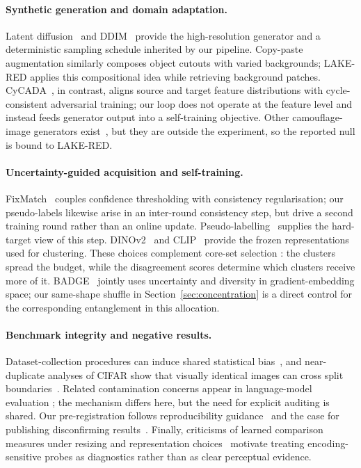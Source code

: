\documentclass{article}
\begin{document}




\paragraph{Synthetic generation and domain adaptation.}
Latent diffusion~\citep{rombach2022high} and DDIM~\citep{song2021denoising} provide the high-resolution
generator and a deterministic sampling schedule inherited by our pipeline. Copy-paste augmentation
\citep{ghiasi2021simple} similarly composes object cutouts with varied backgrounds; LAKE-RED applies
this compositional idea while retrieving background patches. CyCADA~\citep{hoffman2018cycada}, in
contrast, aligns source and target feature distributions with cycle-consistent adversarial training; our loop does not operate at the feature level and instead feeds generator output into a
self-training objective. Other camouflage-image generators exist~\citep{chen2025realcamo}, but they
are outside the experiment, so the reported null is bound to LAKE-RED.

\paragraph{Uncertainty-guided acquisition and self-training.}
FixMatch~\citep{sohn2020fixmatch} couples confidence thresholding with consistency regularisation; our pseudo-labels likewise arise in an inter-round consistency step, but drive a second training
round rather than an online update. Pseudo-labelling~\citep{lee2013pseudo} supplies the hard-target
view of this step. DINOv2~\citep{oquab2024dinov2} and CLIP~\citep{radford2021learning} provide the
frozen representations used for clustering. These choices complement core-set selection
\citep{sener2018active}: the clusters spread the budget, while the disagreement scores determine
which clusters receive more of it. BADGE~\citep{ash2020deep} jointly uses uncertainty and diversity
in gradient-embedding space; our same-shape shuffle in Section~\ref{sec:concentration} is a direct
control for the corresponding entanglement in this allocation.

\paragraph{Benchmark integrity and negative results.}
Dataset-collection procedures can induce shared statistical bias~\citep{torralba2011unbiased}, and
near-duplicate analyses of CIFAR show that visually identical images can cross split
boundaries~\citep{barz2020train}. Related contamination concerns appear in language-model evaluation
\citep{wu2024antileak}; the mechanism differs here, but the need for explicit auditing is shared.
Our pre-registration follows reproducibility guidance~\citep{pineau2021improving} and the case for
publishing disconfirming results~\citep{karl2024position}. Finally, criticisms of learned comparison
measures under resizing and representation choices~\citep{parmar2022aliased,jayasumana2024rethinking}
motivate treating encoding-sensitive probes as diagnostics rather than as clear perceptual evidence.
\end{document}
